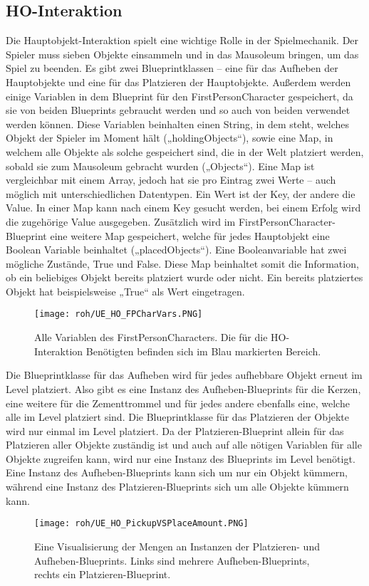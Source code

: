 \subsection{HO-Interaktion}
Die Hauptobjekt-Interaktion spielt eine wichtige Rolle in der Spielmechanik. Der Spieler muss sieben Objekte einsammeln und in das Mausoleum bringen, um das Spiel zu beenden.
Es gibt zwei Blueprintklassen – eine für das Aufheben der Hauptobjekte und eine für das Platzieren der Hauptobjekte. Außerdem werden einige Variablen in dem Blueprint für den FirstPersonCharacter gespeichert, da sie von beiden Blueprints gebraucht werden und so auch von beiden verwendet werden können. Diese Variablen beinhalten einen String, in dem steht, welches Objekt der Spieler im Moment hält („holdingObjects“), sowie eine Map, in welchem alle Objekte als solche gespeichert sind, die in der Welt platziert werden, sobald sie zum Mausoleum gebracht wurden („Objects“). Eine Map ist vergleichbar mit einem Array, jedoch hat sie pro Eintrag zwei Werte – auch möglich mit unterschiedlichen Datentypen. Ein Wert ist der Key, der andere die Value. In einer Map kann nach einem Key gesucht werden, bei einem Erfolg wird die zugehörige Value ausgegeben.
Zusätzlich wird im FirstPersonCharacter-Blueprint eine weitere Map gespeichert, welche für jedes Hauptobjekt eine Boolean Variable beinhaltet („placedObjects“). Eine Booleanvariable hat zwei mögliche Zustände, True und False. Diese Map beinhaltet somit die Information, ob ein beliebiges Objekt bereits platziert wurde oder nicht. Ein bereits platziertes Objekt hat beispielsweise „True“ als Wert eingetragen.
\begin{figure}[H]
    \centering
    \texttt{[image: roh/UE\_HO\_FPCharVars.PNG]}
    \caption{Alle Variablen des FirstPersonCharacters. Die für die HO-Interaktion Benötigten befinden sich im Blau markierten Bereich.}
    \label{UE:HO_FPCharVars}
\end{figure}
Die Blueprintklasse für das Aufheben wird für jedes aufhebbare Objekt erneut im Level platziert. Also gibt es eine Instanz des Aufheben-Blueprints für die Kerzen, eine weitere für die Zementtrommel und für jedes andere ebenfalls eine, welche alle im Level platziert sind.
Die Blueprintklasse für das Platzieren der Objekte wird nur einmal im Level platziert. Da der Platzieren-Blueprint allein für das Platzieren aller Objekte zuständig ist und auch auf alle nötigen Variablen für alle Objekte zugreifen kann, wird nur eine Instanz des Blueprints im Level benötigt.
Eine Instanz des Aufheben-Blueprints kann sich um nur ein Objekt kümmern, während eine Instanz des Platzieren-Blueprints sich um alle Objekte kümmern kann.
\begin{figure}[H]
    \centering
    \texttt{[image: roh/UE\_HO\_PickupVSPlaceAmount.PNG]}
    \caption{Eine Visualisierung der Mengen an Instanzen der Platzieren- und Aufheben-Blueprints. Links sind mehrere Aufheben-Blueprints, rechts ein Platzieren-Blueprint.}
    \label{UE:HO_PickupVSPlaceAmount}
\end{figure}
